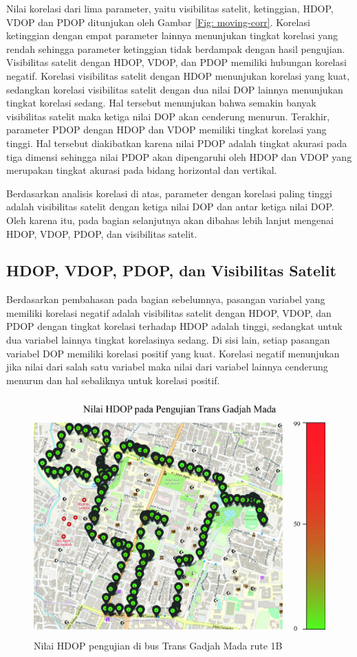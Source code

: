 Nilai korelasi dari lima parameter, yaitu visibilitas satelit, ketinggian, HDOP, VDOP dan PDOP ditunjukan oleh Gambar \ref{Fig: moving-corr}. Korelasi ketinggian dengan empat parameter lainnya menunjukan tingkat korelasi yang rendah sehingga parameter ketinggian tidak berdampak dengan hasil pengujian.  Visibilitas satelit dengan HDOP, VDOP, dan PDOP memiliki hubungan korelasi negatif. Korelasi visibilitas satelit dengan HDOP menunjukan korelasi yang kuat, sedangkan korelasi visibilitas satelit dengan dua nilai DOP lainnya menunjukan tingkat korelasi sedang. Hal tersebut menunjukan bahwa semakin banyak visibilitas satelit maka ketiga nilai DOP akan cenderung menurun. Terakhir, parameter PDOP dengan HDOP dan VDOP memiliki tingkat korelasi yang tinggi. Hal tersebut diakibatkan karena nilai PDOP adalah tingkat akurasi pada tiga dimensi sehingga nilai PDOP akan dipengaruhi oleh HDOP dan VDOP yang merupakan tingkat akurasi pada bidang horizontal dan vertikal.

Berdasarkan analisis korelasi di atas, parameter dengan korelasi paling tinggi adalah visibilitas satelit dengan ketiga nilai DOP dan antar ketiga nilai DOP. Oleh karena itu, pada bagian selanjutnya akan dibahas lebih lanjut mengenai HDOP, VDOP, PDOP, dan visibilitas satelit. 

\subsection{HDOP, VDOP, PDOP, dan Visibilitas Satelit}

Berdasarkan pembahasan pada bagian sebelumnya, pasangan variabel yang memiliki korelasi negatif adalah visibilitas satelit dengan HDOP, VDOP, dan PDOP dengan tingkat korelasi terhadap HDOP adalah tinggi, sedangkat untuk dua variabel lainnya tingkat korelasinya sedang. Di sisi lain, setiap pasangan variabel DOP memiliki korelasi positif yang kuat. Korelasi negatif menunjukan jika nilai dari salah satu variabel maka nilai dari variabel lainnya cenderung menurun dan hal sebaliknya untuk korelasi positif.

\begin{figure}[H]
	\centering
	\includegraphics[width=12cm]{contents/chapter-4/pengujian-bergerak/moving-HDOP.jpg}
	\caption{Nilai HDOP pengujian di bus Trans Gadjah Mada rute 1B}
	\label{Fig: moving-hdop}
\end{figure}

